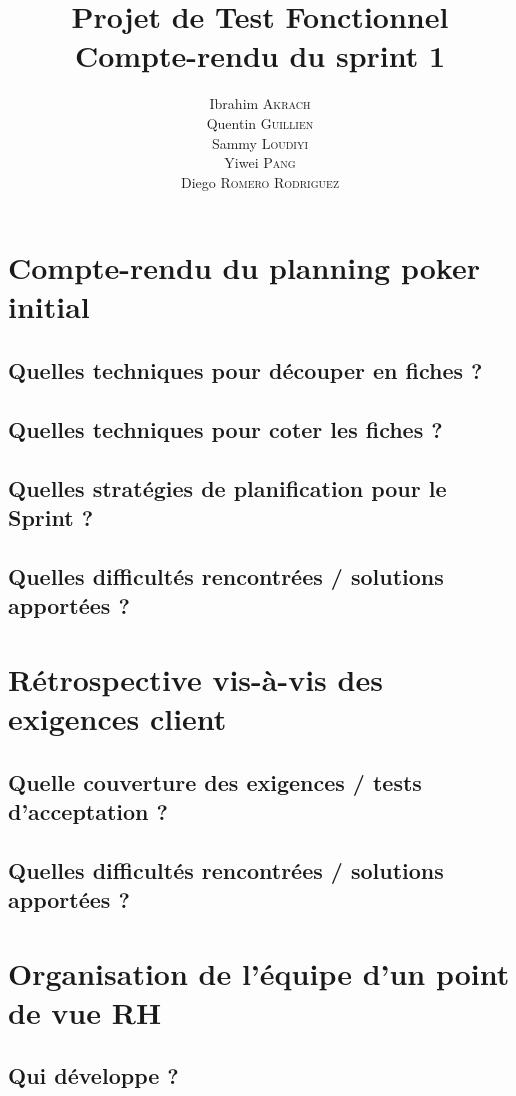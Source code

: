 \documentclass[10pt,a4paper]{article}
\author{
	Ibrahim \textsc{Akrach}
	\\
	Quentin \textsc{Guillien}
	\\
	Sammy \textsc{Loudiyi}
	\\
	Yiwei 	\textsc{Pang}
	\\
	Diego \textsc{Romero Rodriguez}}
\title{\textbf{Projet de Test Fonctionnel} \\ Compte-rendu du sprint 1}
\begin{document}
	\maketitle

	\newpage

	\tableofcontents	
	
	\section{Compte-rendu du planning poker initial}
	
	\subsection{Quelles techniques pour découper en fiches ?}
	\subsection{Quelles techniques pour coter les fiches ?}
	\subsection{Quelles stratégies de planification pour le Sprint ?
	}
	\subsection{Quelles difficultés rencontrées / solutions apportées ?
	}
	
	\section{Rétrospective vis-à-vis des exigences client}
	\subsection{Quelle couverture des exigences / tests d'acceptation ?}
	\subsection{Quelles difficultés rencontrées / solutions apportées ?}

	
	\section{Organisation de l'équipe d'un point de vue RH}
	\subsection{Qui développe ?}
\end{document}

